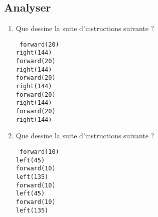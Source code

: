 \subsection{Analyser}
\begin{td}\label{td:dessins}\em {}
\begin{minipage}[t]{7cm}
	\begin{enumerate}
	\item Que dessine la suite d'instructions suivante ?

		{\footnotesize\tt
		forward(20)\\
		right(144)\\
		forward(20)\\
		right(144)\\
		forward(20)\\
		right(144)\\
		forward(20)\\
		right(144)\\
		forward(20)\\
		right(144)
		}
	\end{enumerate}
\end{minipage}
\hfill
\begin{minipage}[t]{7cm}
	\begin{enumerate}\setcounter{enumi}{1}
	\item Que dessine la suite d'instructions suivante ?

		{\footnotesize\tt 
		forward(10)\\
		left(45)\\
		forward(10)\\
		left(135)\\
		forward(10)\\
		left(45)\\
		forward(10)\\
		left(135)
		}
	\end{enumerate}
\end{minipage}
\end{td}

